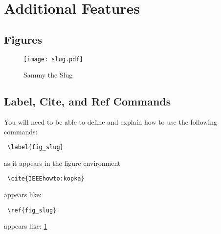\documentclass[12pt,journal,compsoc]{IEEEtran}
\begin{document}

\section{Additional Features}

\subsection{Figures}


\begin{figure}[h] 	%
\centering
\texttt{[image: slug.pdf]}
\caption{Sammy the Slug}
\label{fig_slug}
\end{figure}


\subsection{Label, Cite, and Ref Commands}
You will need to be able to define and explain how to use the following commands:
\begin{verbatim} \label{fig_slug} \end{verbatim} as it appears in the figure environment\\
\begin{verbatim} \cite{IEEEhowto:kopka} \end{verbatim} appears like: \cite{IEEEhowto:kopka}\\
\begin{verbatim} \ref{fig_slug} \end{verbatim} appears like: \ref{fig_slug}\\


\end{document}
